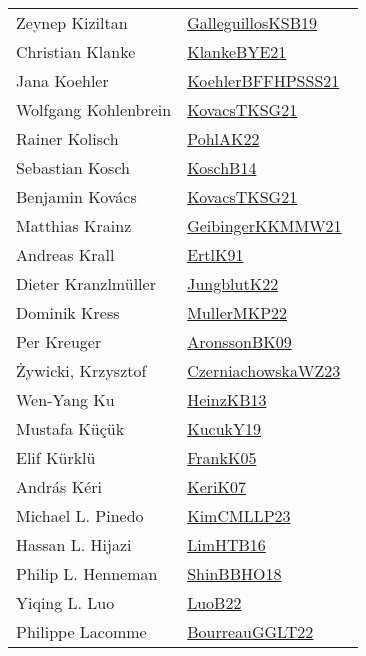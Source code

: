 {\begin{longtable}{p{4cm}p{20cm}}
Zeynep Kiziltan & \href{works/GalleguillosKSB19.pdf}{GalleguillosKSB19}~\cite{GalleguillosKSB19}\\
Christian Klanke & \href{works/KlankeBYE21.pdf}{KlankeBYE21}~\cite{KlankeBYE21}\\
Jana Koehler & \href{works/KoehlerBFFHPSSS21.pdf}{KoehlerBFFHPSSS21}~\cite{KoehlerBFFHPSSS21}\\
Wolfgang Kohlenbrein & \href{works/KovacsTKSG21.pdf}{KovacsTKSG21}~\cite{KovacsTKSG21}\\
Rainer Kolisch & \href{works/PohlAK22.pdf}{PohlAK22}~\cite{PohlAK22}\\
Sebastian Kosch & \href{works/KoschB14.pdf}{KoschB14}~\cite{KoschB14}\\
Benjamin Kov{\'{a}}cs & \href{works/KovacsTKSG21.pdf}{KovacsTKSG21}~\cite{KovacsTKSG21}\\
Matthias Krainz & \href{works/GeibingerKKMMW21.pdf}{GeibingerKKMMW21}~\cite{GeibingerKKMMW21}\\
Andreas Krall & \href{works/ErtlK91.pdf}{ErtlK91}~\cite{ErtlK91}\\
Dieter Kranzlm{\"{u}}ller & \href{works/JungblutK22.pdf}{JungblutK22}~\cite{JungblutK22}\\
Dominik Kress & \href{works/MullerMKP22.pdf}{MullerMKP22}~\cite{MullerMKP22}\\
Per Kreuger & \href{works/AronssonBK09.pdf}{AronssonBK09}~\cite{AronssonBK09}\\
Żywicki, Krzysztof & \href{works/CzerniachowskaWZ23.pdf}{CzerniachowskaWZ23}~\cite{CzerniachowskaWZ23}\\
Wen{-}Yang Ku & \href{works/HeinzKB13.pdf}{HeinzKB13}~\cite{HeinzKB13}\\
Mustafa K{\"u}ç{\"u}k & \href{works/KucukY19.pdf}{KucukY19}~\cite{KucukY19}\\
Elif K{\"{u}}rkl{\"{u}} & \href{works/FrankK05.pdf}{FrankK05}~\cite{FrankK05}\\
Andr{\'{a}}s K{\'{e}}ri & \href{works/KeriK07.pdf}{KeriK07}~\cite{KeriK07}\\
Michael L. Pinedo & \href{works/KimCMLLP23.pdf}{KimCMLLP23}~\cite{KimCMLLP23}\\
Hassan L. Hijazi & \href{works/LimHTB16.pdf}{LimHTB16}~\cite{LimHTB16}\\
Philip L. Henneman & \href{works/ShinBBHO18.pdf}{ShinBBHO18}~\cite{ShinBBHO18}\\
Yiqing L. Luo & \href{works/LuoB22.pdf}{LuoB22}~\cite{LuoB22}\\
Philippe Lacomme & \href{works/BourreauGGLT22.pdf}{BourreauGGLT22}~\cite{BourreauGGLT22}\\

\end{longtable}}

